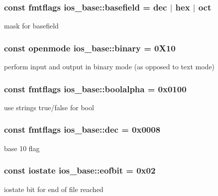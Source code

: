 \subsubsection[{\texorpdfstring{basefield}{basefield}}]{\setlength{\rightskip}{0pt plus 5cm}const {\bf fmtflags} ios\+\_\+base\+::basefield = {\bf dec} $\vert$ {\bf hex} $\vert$ {\bf oct}\hspace{0.3cm}{\ttfamily [static]}}\hypertarget{classios__base_a75ce5482aa207d7aa0265d138b50a102}{}\label{classios__base_a75ce5482aa207d7aa0265d138b50a102}
mask for basefield 
\subsubsection[{\texorpdfstring{binary}{binary}}]{\setlength{\rightskip}{0pt plus 5cm}const {\bf openmode} ios\+\_\+base\+::binary = 0\+X10\hspace{0.3cm}{\ttfamily [static]}}\hypertarget{classios__base_ac99947c17c2936d15243671366605602}{}\label{classios__base_ac99947c17c2936d15243671366605602}
perform input and output in binary mode (as opposed to text mode) 
\subsubsection[{\texorpdfstring{boolalpha}{boolalpha}}]{\setlength{\rightskip}{0pt plus 5cm}const {\bf fmtflags} ios\+\_\+base\+::boolalpha = 0x0100\hspace{0.3cm}{\ttfamily [static]}}\hypertarget{classios__base_afa74acd95d4bbc7cc3551251aac2bf00}{}\label{classios__base_afa74acd95d4bbc7cc3551251aac2bf00}
use strings true/false for bool 
\subsubsection[{\texorpdfstring{dec}{dec}}]{\setlength{\rightskip}{0pt plus 5cm}const {\bf fmtflags} ios\+\_\+base\+::dec = 0x0008\hspace{0.3cm}{\ttfamily [static]}}\hypertarget{classios__base_a2826aed005e7c1f6858060cddae7971a}{}\label{classios__base_a2826aed005e7c1f6858060cddae7971a}
base 10 flag 
\subsubsection[{\texorpdfstring{eofbit}{eofbit}}]{\setlength{\rightskip}{0pt plus 5cm}const {\bf iostate} ios\+\_\+base\+::eofbit = 0x02\hspace{0.3cm}{\ttfamily [static]}}\hypertarget{classios__base_af75072b7ef2a931c77a2cb8e7ccda460}{}\label{classios__base_af75072b7ef2a931c77a2cb8e7ccda460}
iostate bit for end of file reached 
